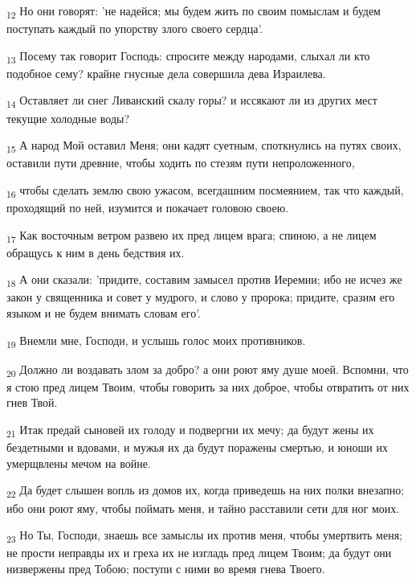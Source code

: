 \begin{tcolorbox}
\textsubscript{12} Но они говорят: 'не надейся; мы будем жить по своим помыслам и будем поступать каждый по упорству злого своего сердца'.
\end{tcolorbox}
\begin{tcolorbox}
\textsubscript{13} Посему так говорит Господь: спросите между народами, слыхал ли кто подобное сему? крайне гнусные дела совершила дева Израилева.
\end{tcolorbox}
\begin{tcolorbox}
\textsubscript{14} Оставляет ли снег Ливанский скалу горы? и иссякают ли из других мест текущие холодные воды?
\end{tcolorbox}
\begin{tcolorbox}
\textsubscript{15} А народ Мой оставил Меня; они кадят суетным, споткнулись на путях своих, оставили пути древние, чтобы ходить по стезям пути непроложенного,
\end{tcolorbox}
\begin{tcolorbox}
\textsubscript{16} чтобы сделать землю свою ужасом, всегдашним посмеянием, так что каждый, проходящий по ней, изумится и покачает головою своею.
\end{tcolorbox}
\begin{tcolorbox}
\textsubscript{17} Как восточным ветром развею их пред лицем врага; спиною, а не лицем обращусь к ним в день бедствия их.
\end{tcolorbox}
\begin{tcolorbox}
\textsubscript{18} А они сказали: 'придите, составим замысел против Иеремии; ибо не исчез же закон у священника и совет у мудрого, и слово у пророка; придите, сразим его языком и не будем внимать словам его'.
\end{tcolorbox}
\begin{tcolorbox}
\textsubscript{19} Внемли мне, Господи, и услышь голос моих противников.
\end{tcolorbox}
\begin{tcolorbox}
\textsubscript{20} Должно ли воздавать злом за добро? а они роют яму душе моей. Вспомни, что я стою пред лицем Твоим, чтобы говорить за них доброе, чтобы отвратить от них гнев Твой.
\end{tcolorbox}
\begin{tcolorbox}
\textsubscript{21} Итак предай сыновей их голоду и подвергни их мечу; да будут жены их бездетными и вдовами, и мужья их да будут поражены смертью, и юноши их умерщвлены мечом на войне.
\end{tcolorbox}
\begin{tcolorbox}
\textsubscript{22} Да будет слышен вопль из домов их, когда приведешь на них полки внезапно; ибо они роют яму, чтобы поймать меня, и тайно расставили сети для ног моих.
\end{tcolorbox}
\begin{tcolorbox}
\textsubscript{23} Но Ты, Господи, знаешь все замыслы их против меня, чтобы умертвить меня; не прости неправды их и греха их не изгладь пред лицем Твоим; да будут они низвержены пред Тобою; поступи с ними во время гнева Твоего.
\end{tcolorbox}
